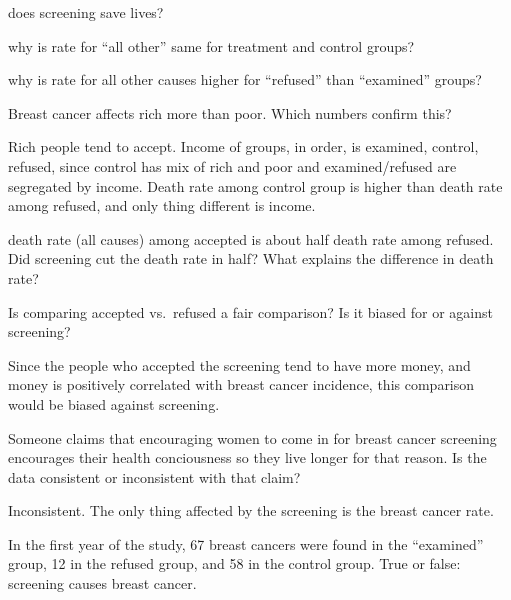 \documentclass[landscape]{exam}
\begin{document}
  \begin{itemize*}
    \item does screening save lives?
    \item why is rate for ``all other'' same for treatment and control groups?
    \item why is rate for all other causes higher for ``refused'' than
      ``examined'' groups?

    \item Breast cancer affects rich more than poor.  Which numbers confirm
      this?

      \begin{solution}
        Rich people tend to accept.  Income of groups, in order, is examined,
        control, refused, since control has mix of rich and poor and
        examined/refused are segregated by income.  Death rate among control
        group is higher than death rate among refused, and only thing different
        is income.
      \end{solution}

    \item death rate (all causes) among accepted is about half death rate among
      refused.  Did screening cut the death rate in half?  What explains the
      difference in death rate?

    \item Is comparing accepted vs.\ refused a fair comparison?  Is it biased for
      or against screening?

      \begin{solution}
        Since the people who accepted the screening tend to have more money, and
        money is positively correlated with breast cancer incidence, this
        comparison would be biased against screening.
      \end{solution}

    \item Someone claims that encouraging women to come in for breast cancer
      screening encourages their health conciousness so they live longer for
      that reason.  Is the data consistent or inconsistent with that claim?

      \begin{solution}
        Inconsistent.  The only thing affected by the screening is the breast
        cancer rate.
      \end{solution}

    \item In the first year of the study, 67 breast cancers were found in the
      ``examined'' group, 12 in the refused group, and 58 in the control group.
      True or false: screening causes breast cancer.


\end{itemize*}
\end{document}
